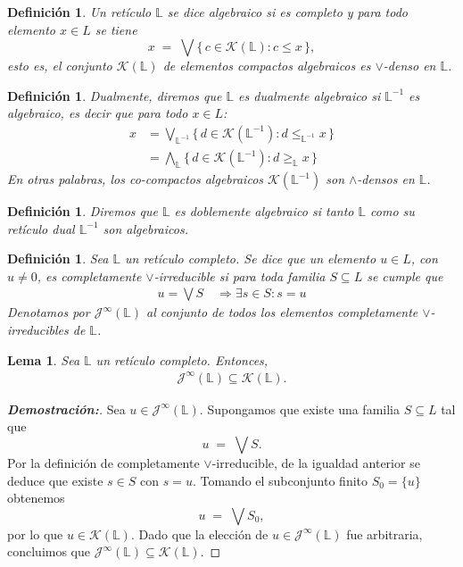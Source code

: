 \documentclass[12pt]{book}
\newtheorem{lemma}[theorem]{Lema}
\newtheorem{definition}[theorem]{Definición}
\begin{document}
\begin{definition}
Un retículo $\mathbb{L}$ se dice \emph{algebraico} si es completo y para todo elemento $x \in L$ se tiene
\[
x \;=\; \bigvee \{\, c \in \mathcal{K}(\mathbb{L}) : c \le x \,\},
\]
esto es, el conjunto $\mathcal{K}(\mathbb{L})$ de elementos compactos algebraicos es $\vee$-denso en $\mathbb{L}$.
\end{definition}

\begin{definition} Dualmente, diremos que $\mathbb{L}$ es \emph{dualmente algebraico} si $\mathbb{L}^{-1}$ es algebraico, es decir que para todo \(x\in L\):
\begin{align*}
    x&=\bigvee\nolimits_{\mathbb L^{-1}}\{\,d\in \mathcal{K}(\mathbb L^{-1}): d\le_{\mathbb L^{-1}} x\,\}\\
    &= \bigwedge\nolimits_{\mathbb L}\{\,d\in \mathcal{K}(\mathbb L^{-1}): d\ge_{\mathbb L} x\,\}
\end{align*}
En otras palabras, los \emph{co-compactos algebraicos} $\mathcal{K}(\mathbb{L}^{-1})$ son $\wedge$-densos en $\mathbb{L}$.
\end{definition}

\begin{definition}
Diremos que $\mathbb{L}$ es \emph{doblemente algebraico} si tanto $\mathbb{L}$ como su retículo dual $\mathbb{L}^{-1}$ son algebraicos. 
\end{definition}


\begin{definition} Sea $\mathbb{L}$ un retículo completo. Se dice que un elemento $u\in L$, con $u\neq 0$, es \emph{completamente $\vee$-irreducible} si para toda familia $S\subseteq L$ se cumple que
\begin{align*}
u = \bigvee S \quad \Longrightarrow \exists s\in S: s=u
\end{align*}
Denotamos por $\mathcal{J}^{\infty}(\mathbb{L})$ al conjunto de todos los elementos completamente $\vee$-irreducibles de $\mathbb{L}$.
\end{definition}

\begin{lemma}\label{thm:J-en-K} Sea $\mathbb{L}$ un retículo completo. Entonces,   
\begin{align*}
\mathcal{J}^{\infty}(\mathbb{L}) \subseteq \mathcal{K}(\mathbb{L}).
\end{align*}
\end{lemma}

\begin{proof}[\textbf{Demostración:}]
Sea $u\in\mathcal{J}^{\infty}(\mathbb{L})$. Supongamos que existe una familia
$S\subseteq L$ tal que
\[
u \;=\; \bigvee S.
\]
Por la definición de completamente $\vee$-irreducible, de la igualdad anterior
se deduce que existe $s\in S$ con $s=u$. Tomando el subconjunto finito $S_0=\{u\}$
obtenemos
\[
u \;=\; \bigvee S_0,
\]
por lo que
$u\in \mathcal{K}(\mathbb{L})$. Dado que la elección de $u\in\mathcal{J}^\infty(\mathbb{L})$
fue arbitraria, concluimos que
$\mathcal{J}^{\infty}(\mathbb{L}) \subseteq \mathcal{K}(\mathbb{L})$.
\end{proof}
\end{document}
